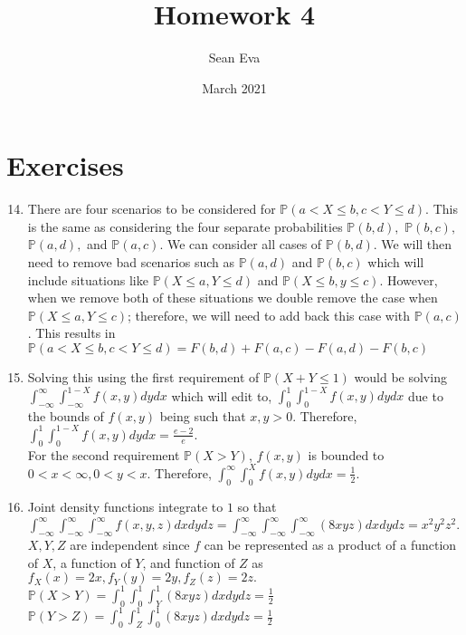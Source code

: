 \documentclass{article}
\title{Homework 4}
\author{Sean Eva}
\date{March 2021}
\begin{document}
\maketitle

\section{Exercises}

\begin{enumerate}
    \setcounter{enumi}{13}
    \item 
    
    There are four scenarios to be considered for $\mathbb{P}(a < X \leq b, c < Y \leq d)$. This is the same as considering the four separate  probabilities $\mathbb{P}(b, d),$ $\mathbb{P}(b, c),$ $ \mathbb{P}(a, d),$ and $\mathbb{P}(a, c)$. We can consider all cases of $\mathbb{P}(b, d)$. We will then need to remove bad scenarios such as $\mathbb{P}(a, d)$ and $\mathbb{P}(b, c)$ which will include situations like $\mathbb{P}(X\leq a, Y\leq d)$ and $\mathbb{P}(X\leq b, y\leq c)$. However, when we remove both of these situations we double remove the case when $\mathbb{P}(X\leq a, Y\leq c)$; therefore, we will need to add back this case with $\mathbb{P}(a, c)$. This results in $\mathbb{P}(a < X \leq b, c < Y \leq d) = F(b, d) + F(a, c) - F(a, d) - F(b, c)$
    
    \setcounter{enumi}{25}
    \item
    
    Solving this using the first requirement of $\mathbb{P}(X+Y\leq1)$ would be solving $\int_{-\infty}^{\infty}\int_{-\infty}^{1-X}f(x,y)dydx$ which will edit to, $\int_{0}^{1}\int_{0}^{1-X}f(x,y)dydx$ due to the bounds of $f(x,y)$ being such that $x,y>0$. Therefore, $\int_{0}^{1}\int_{0}^{1-X}f(x,y)dydx = \frac{e-2}{e}.$ \\
    For the second requirement $\mathbb{P}(X>Y)$, $f(x,y)$ is bounded to $0<x<\infty, 0<y<x$. Therefore, $\int_{0}^{\infty}\int_{0}^{X}f(x,y)dydx=\frac{1}{2}.$
    
    \setcounter{enumi}{35}
    \item
    
    Joint density functions integrate to $1$ so that $\int_{-\infty}^{\infty}\int_{-\infty}^{\infty}\int_{-\infty}^{\infty}f(x,y,z)dxdydz=\int_{-\infty}^{\infty}\int_{-\infty}^{\infty}\int_{-\infty}^{\infty}(8xyz)dxdydz=x^2y^2z^2$. $X,Y,Z$ are independent since $f$ can be represented as a product of a function of $X$, a function of $Y$, and function of $Z$ as $f_X(x)=2x, f_Y(y)=2y, f_Z(z)=2z.$ \\
    $\mathbb{P}(X>Y)=\int_{0}^{1}\int_{0}^{1}\int_{Y}^{1}(8xyz)dxdydz=\frac{1}{2}$\\
    $\mathbb{P}(Y>Z)=\int_{0}^{1}\int_{Z}^{1}\int_{0}^{1}(8xyz)dxdydz=\frac{1}{2}$
    

\end{enumerate}
\end{document}
